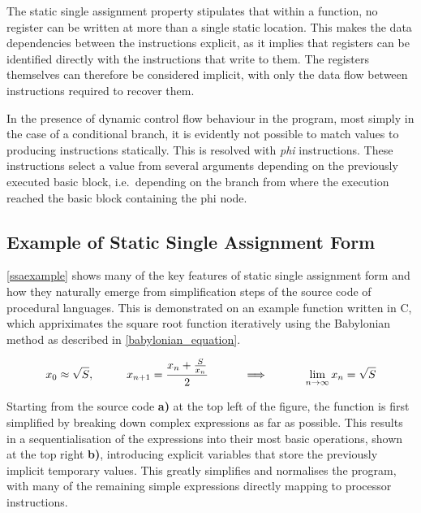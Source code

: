     The static single assignment property stipulates that within a function,
    no register can be written at more than a single static location.
    This makes the data dependencies between the instructions explicit, as it
    implies that registers can be identified directly with the instructions that
    write to them.
    The registers themselves can therefore be considered implicit, with only the
    data flow between instructions required to recover them.

    In the presence of dynamic control flow behaviour in the program, most
    simply in the case of a conditional branch, it is evidently not possible to
    match values to producing instructions statically.
    This is resolved with {\em phi} instructions.
    These instructions select a value from several arguments depending on the
    previously executed basic block, i.e.\ depending on the branch from where
    the execution reached the basic block containing the phi node.

\subsection{Example of Static Single Assignment Form}

    \autoref{ssaexample} shows many of the key features of static single
    assignment form and how they naturally emerge from simplification steps of
    the source code of procedural languages.
    This is demonstrated on an example function written in C, which appriximates
    the square root function iteratively using the Babylonian method as
    described in \autoref{babylonian_equation}.

\begin{equation}
    x_0\approx\sqrt{S},\text{\hspace{1cm}}
    x_{n+1}=\frac{x_n+\frac{S}{x_n}}{2}\text{\hspace{1cm}}
    \implies\text{\hspace{1cm}}
    \lim_{n\rightarrow\infty}x_n=\sqrt{S}
    \label{babylonian_equation}
\end{equation}

    Starting from the source code {\bf a)} at the top left of the figure, the
    function is first simplified by breaking down complex expressions as far as
    possible.
    This results in a sequentialisation of the expressions into their
    most basic operations, shown at the top right {\bf b)}, introducing
    explicit variables that store the previously implicit temporary values.
    This greatly simplifies and normalises the program, with many of the
    remaining simple expressions directly mapping to processor instructions.

